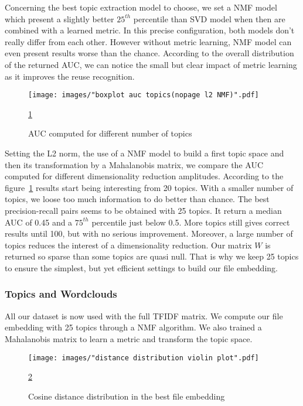 \documentclass[a4paper]{article}
\begin{document}
	Concerning the best topic extraction model to choose, we set a \ac{NMF} model which present a slightly better $25^{th}$ percentile than \ac{SVD} model when then are combined with a learned metric. In this precise configuration, both models don't really differ from each other. However without metric learning, \ac{NMF} model can even present results worse than the chance. According to the overall distribution of the returned \ac{AUC}, we can notice the small but clear impact of metric learning as it improves the reuse recognition.
	
	\begin{figure}
		\centering
		\texttt{[image: images/"boxplot auc topics(nopage l2 NMF)".pdf]}
		\caption{AUC computed for different number of topics}
		\ref{fig:topics-comparison}
		\label{fig:topics-comparison}
	\end{figure}	
	
	Setting the L2 norm, the use of a \ac{NMF} model to build a first topic space and then its transformation by a Mahalanobis matrix, we compare the \ac{AUC} computed for different dimensionality reduction amplitudes. According to the figure~\ref{fig:topics-comparison} results start being interesting from 20 topics. With a smaller number of topics, we loose too much information to do better than chance. The best precision-recall pairs seems to be obtained with 25 topics. It return a median \ac{AUC} of 0.45 and a $75^{th}$ percentile just below 0.5. More topics still gives correct results until 100, but with no serious improvement. Moreover, a large number of topics reduces the interest of a dimensionality reduction. Our matrix $W$ is returned so sparse than some topics are quasi null. That is why we keep 25 topics to ensure the simplest, but yet efficient settings to build our file embedding.
	
	\subsubsection{Topics and Wordclouds}
	
	All our dataset is now used with the full \ac{TFIDF} matrix. We compute our file embedding with 25 topics through a \ac{NMF} algorithm. We also trained a Mahalanobis matrix to learn a metric and transform the topic space.
	
	\begin{figure}
		\centering
		\texttt{[image: images/"distance distribution violin plot".pdf]}
		\caption{Cosine distance distribution in the best file embedding}
		\ref{fig:distance-distribution}
		\label{fig:distance-distribution}
	\end{figure}
	
\end{document}
